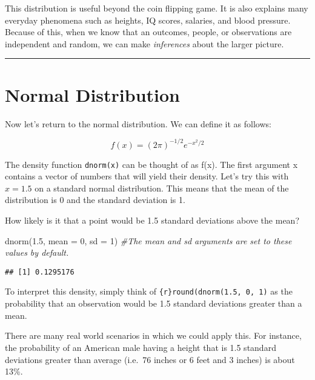 \documentclass[
]{book}
\newenvironment{Shaded}{\begin{snugshade}}{\end{snugshade}}
\newcommand{\AttributeTok}[1]{\textcolor[rgb]{0.77,0.63,0.00}{#1}}
\newcommand{\CommentTok}[1]{\textcolor[rgb]{0.56,0.35,0.01}{\textit{#1}}}
\newcommand{\DecValTok}[1]{\textcolor[rgb]{0.00,0.00,0.81}{#1}}
\newcommand{\FloatTok}[1]{\textcolor[rgb]{0.00,0.00,0.81}{#1}}
\newcommand{\FunctionTok}[1]{\textcolor[rgb]{0.00,0.00,0.00}{#1}}
\newcommand{\NormalTok}[1]{#1}
\begin{document}
This distribution is useful beyond the coin flipping game. It is also explains many everyday phenomena such as heights, IQ scores, salaries, and blood pressure. Because of this, when we know that an outcomes, people, or observations are independent and random, we can make \emph{inferences} about the larger picture.

\begin{center}\rule{0.5\linewidth}{0.5pt}\end{center}

\hypertarget{normal-distribution}{%
\section{Normal Distribution}\label{normal-distribution}}

Now let's return to the normal distribution. We can define it as follows:

\[f(x)=(2\pi)^{-1/2}e^{-x^2/2}\]

The density function \texttt{dnorm(x)} can be thought of as f(x). The first argument x contains a vector of numbers that will yield their density. Let's try this with \(x = 1.5\) on a standard normal distribution. This means that the mean of the distribution is 0 and the standard deviation is 1.

How likely is it that a point would be 1.5 standard deviations above the mean?

\begin{Shaded}
\begin{Highlighting}[]
\FunctionTok{dnorm}\NormalTok{(}\FloatTok{1.5}\NormalTok{, }\AttributeTok{mean =} \DecValTok{0}\NormalTok{, }\AttributeTok{sd =} \DecValTok{1}\NormalTok{) }\CommentTok{\#The mean and sd arguments are set to these values by default.}
\end{Highlighting}
\end{Shaded}

\begin{verbatim}
## [1] 0.1295176
\end{verbatim}

To interpret this density, simply think of \texttt{\{r\}round(dnorm(1.5,\ 0,\ 1)} as the probability that an observation would be 1.5 standard deviations greater than a mean.

There are many real world scenarios in which we could apply this. For instance, the probability of an American male having a height that is 1.5 standard deviations greater than average (i.e.~76 inches or 6 feet and 3 inches) is about 13\%.
\end{document}
